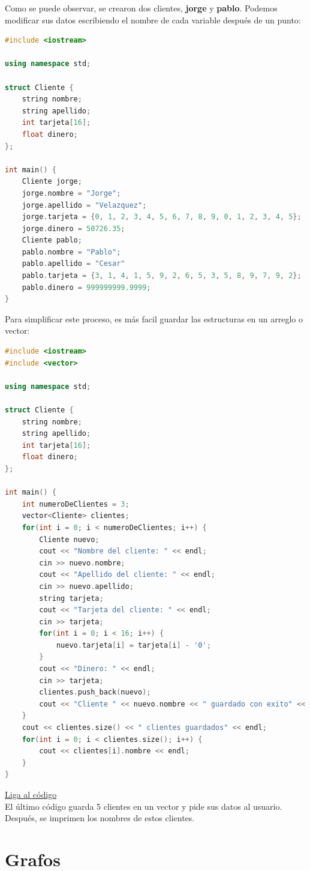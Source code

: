 \documentclass{article}
\begin{document}
Como se puede observar, se crearon dos clientes, \textbf{jorge} y \textbf{pablo}. Podemos modificar sus datos escribiendo el nombre de cada variable después de un punto:

\begin{lstlisting}[language=C++, title=Modificando valores]
#include <iostream>

using namespace std;

struct Cliente {
	string nombre;
	string apellido;
	int tarjeta[16];
	float dinero;
};

int main() {
	Cliente jorge;
	jorge.nombre = "Jorge";
	jorge.apellido = "Velazquez";
	jorge.tarjeta = {0, 1, 2, 3, 4, 5, 6, 7, 8, 9, 0, 1, 2, 3, 4, 5};
	jorge.dinero = 50726.35;
	Cliente pablo;
	pablo.nombre = "Pablo";
	pablo.apellido = "Cesar"
	pablo.tarjeta = {3, 1, 4, 1, 5, 9, 2, 6, 5, 3, 5, 8, 9, 7, 9, 2};
	pablo.dinero = 999999999.9999;
}
\end{lstlisting}

Para simplificar este proceso, es más facil guardar las estructuras en un arreglo o vector:

\begin{lstlisting}[language=C++, title=Clientes bancarios]
#include <iostream>
#include <vector>

using namespace std;

struct Cliente {
	string nombre;
	string apellido;
	int tarjeta[16];
	float dinero;
};

int main() {
	int numeroDeClientes = 3;
	vector<Cliente> clientes;
	for(int i = 0; i < numeroDeClientes; i++) {
		Cliente nuevo;
		cout << "Nombre del cliente: " << endl;
		cin >> nuevo.nombre;
		cout << "Apellido del cliente: " << endl;
		cin >> nuevo.apellido;
		string tarjeta;
		cout << "Tarjeta del cliente: " << endl;
		cin >> tarjeta;
		for(int i = 0; i < 16; i++) {
			nuevo.tarjeta[i] = tarjeta[i] - '0';
		}
		cout << "Dinero: " << endl;
		cin >> tarjeta;
		clientes.push_back(nuevo);
		cout << "Cliente " << nuevo.nombre << " guardado con exito" << endl;
	}
	cout << clientes.size() << " clientes guardados" << endl;
	for(int i = 0; i < clientes.size(); i++) {
		cout << clientes[i].nombre << endl;
	}
}
\end{lstlisting}
\href{https://repl.it/@Jamesscn/Structs}{Liga al código} \\

El último código guarda 5 clientes en un vector y pide sus datos al usuario. Después, se imprimen los nombres de estos clientes.

\section{Grafos}
\end{document}
